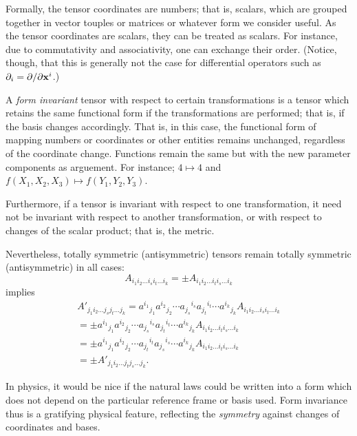 Formally, the tensor coordinates are numbers; that is, scalars,
which are grouped together in vector touples or matrices or whatever form we consider useful.
As the tensor coordinates are scalars, they can be treated as scalars.
For instance, due to commutativity and associativity, one can exchange
their order. (Notice, though, that this is generally not the case for
differential operators such as $\partial_i=\partial / \partial {\bf x}^i$.)

A {\em form invariant} tensor with respect to  certain transformations
is a tensor which retains
the same functional form if the transformations are performed; that is,
if the basis changes accordingly.
That is, in this case,
the functional form of mapping numbers or coordinates or other entities remains unchanged, regardless of the coordinate change.
Functions remain the same but with the new parameter components as
arguement. For instance; $4\mapsto 4$ and $f(X_1,X_2,X_3)\mapsto
f( Y _1, Y _2, Y _3)$.

Furthermore, if a tensor is invariant with respect to one transformation, it need not
be invariant with respect to another transformation, or with respect to
changes of the scalar product; that is, the metric.

Nevertheless, totally symmetric (antisymmetric) tensors remain totally
symmetric (antisymmetric) in all cases:
\begin{equation}
A_{i_1i_2 \ldots i_si_t\ldots i_k}
=
\pm A_{i_1i_2 \ldots i_ti_s\ldots i_k}
\end{equation}
implies
\begin{equation}
\begin{split}
A'_{j_1i_2 \ldots j_s j_t\ldots j_k}
=
{a^{i_1}}_{j_1}{a^{i_2}}_{j_2}
\cdots
{a_{j_s}}^{i_s}{a_{j_t}}^{i_t}
\cdots
{a^{i_k}}_{j_k} A_{i_1 i_2\ldots i_s i_t\ldots  i_k}
 \\
=
\pm {a^{i_1}}_{j_1}{a^{i_2}}_{j_2}\cdots
{a_{j_s}}^{i_s}{a_{j_t}}^{i_t}\cdots
{a^{i_k}}_{j_k} A_{i_1 i_2\ldots i_t i_s\ldots  i_k}
  \\
=
\pm {a^{i_1}}_{j_1}{a^{i_2}}_{j_2}
\cdots
{a_{j_t}}^{i_t}{a_{j_s}}^{i_s}
\cdots
{a^{i_k}}_{j_k} A_{i_1 i_2\ldots i_t i_s\ldots  i_k}
  \\
=
\pm A'_{j_1i_2 \ldots j_t j_s\ldots j_k}    .
\end{split}
\end{equation}


In physics, it would be nice if the natural laws could be written into a
form which does not depend on the particular reference frame or  basis
used.
Form invariance thus is a gratifying physical feature, reflecting the
{\em symmetry} against changes of coordinates and bases.

